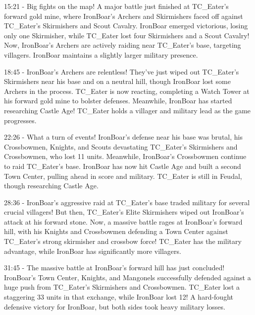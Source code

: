 15:21 - Big fights on the map! A major battle just finished at TC\_Eater's forward gold mine, where IronBoar's Archers and Skirmishers faced off against TC\_Eater's Skirmishers and Scout Cavalry. IronBoar emerged victorious, losing only one Skirmisher, while TC\_Eater lost four Skirmishers and a Scout Cavalry! Now, IronBoar's Archers are actively raiding near TC\_Eater's base, targeting villagers. IronBoar maintains a slightly larger military presence. \par \vspace{1em}

18:45 - IronBoar's Archers are relentless! They've just wiped out TC\_Eater's Skirmishers near his base and on a neutral hill, though IronBoar lost some Archers in the process. TC\_Eater is now reacting, completing a Watch Tower at his forward gold mine to bolster defenses. Meanwhile, IronBoar has started researching Castle Age! TC\_Eater holds a villager and military lead as the game progresses. \par \vspace{1em}

22:26 - What a turn of events! IronBoar's defense near his base was brutal, his Crossbowmen, Knights, and Scouts devastating TC\_Eater's Skirmishers and Crossbowmen, who lost 11 units. Meanwhile, IronBoar's Crossbowmen continue to raid TC\_Eater's base. IronBoar has now hit Castle Age and built a second Town Center, pulling ahead in score and military. TC\_Eater is still in Feudal, though researching Castle Age. \par \vspace{1em}

28:36 - IronBoar's aggressive raid at TC\_Eater's base traded military for several crucial villagers! But then, TC\_Eater's Elite Skirmishers wiped out IronBoar's attack at his forward stone. Now, a massive battle rages at IronBoar's forward hill, with his Knights and Crossbowmen defending a Town Center against TC\_Eater's strong skirmisher and crossbow force! TC\_Eater has the military advantage, while IronBoar has significantly more villagers. \par \vspace{1em}

31:45 - The massive battle at IronBoar's forward hill has just concluded! IronBoar's Town Center, Knights, and Mangonels successfully defended against a huge push from TC\_Eater's Skirmishers and Crossbowmen. TC\_Eater lost a staggering 33 units in that exchange, while IronBoar lost 12! A hard-fought defensive victory for IronBoar, but both sides took heavy military losses. \par \vspace{1em}

